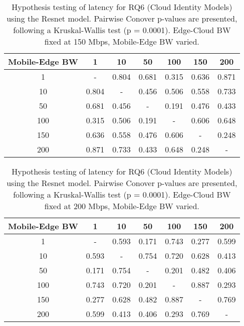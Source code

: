 \begin{table}[H]
\caption{Hypothesis testing of latency for RQ6 (Cloud Identity Models) using the Resnet model. Pairwise Conover p-values are presented, following a Kruskal-Wallis test (p = 0.0001). Edge-Cloud BW fixed at 150 Mbps, Mobile-Edge BW varied.}
\centering
\begin{tabular}{c|cccccc}
Mobile-Edge BW & 1 & 10 & 50 & 100 & 150 & 200 \\
\hline
1 & - & 0.804 & 0.681 & 0.315 & 0.636 & 0.871 \\
10 & 0.804 & - & 0.456 & 0.506 & 0.558 & 0.733 \\
50 & 0.681 & 0.456 & - & 0.191 & 0.476 & 0.433 \\
100 & 0.315 & 0.506 & 0.191 & - & 0.606 & 0.648 \\
150 & 0.636 & 0.558 & 0.476 & 0.606 & - & 0.248 \\
200 & 0.871 & 0.733 & 0.433 & 0.648 & 0.248 & - \\
\end{tabular}
\end{table}

\begin{table}[H]
\caption{Hypothesis testing of latency for RQ6 (Cloud Identity Models) using the Resnet model. Pairwise Conover p-values are presented, following a Kruskal-Wallis test (p = 0.0001). Edge-Cloud BW fixed at 200 Mbps, Mobile-Edge BW varied.}
\centering
\begin{tabular}{c|cccccc}
Mobile-Edge BW & 1 & 10 & 50 & 100 & 150 & 200 \\
\hline
1 & - & 0.593 & 0.171 & 0.743 & 0.277 & 0.599 \\
10 & 0.593 & - & 0.754 & 0.720 & 0.628 & 0.413 \\
50 & 0.171 & 0.754 & - & 0.201 & 0.482 & 0.406 \\
100 & 0.743 & 0.720 & 0.201 & - & 0.887 & 0.293 \\
150 & 0.277 & 0.628 & 0.482 & 0.887 & - & 0.769 \\
200 & 0.599 & 0.413 & 0.406 & 0.293 & 0.769 & - \\
\end{tabular}
\end{table}

